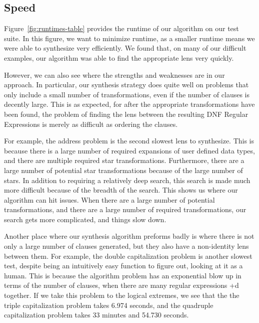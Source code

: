 \documentclass[numbers]{sigplanconf}
\begin{document}
\subsection{Speed}
Figure~\ref{fig:runtimes-table} provides the runtime of our algorithm on our
test suite.
In this figure, we want to minimize runtime, as a smaller runtime means we were
able to synthesize very efficiently.
We found that, on many of our difficult examples, our algorithm was able to find
the appropriate lens very quickly.

However, we can also see where the strengths and weaknesses are in our approach.
In particular, our synthesis strategy does quite well on problems that only
include a small number of transformations, even if the number of clauses is
decently large.
This is as expected, for after the appropriate transformations have been found,
the problem of finding the lens between the resulting DNF Regular Expressions
is merely as difficult as ordering the clauses.

For example, the address problem is the second slowest lens to synthesize.
This is because there is a large number of required expansions of user defined
data types, and there are multiple required star transformations.
Furthermore, there are a large number of potential star transformations because
of the large number of stars.
In addition to requiring a relatively deep search, this search is made much
more difficult because of the breadth of the search.
This shows us where our algorithm can hit issues.
When there are a large number of potential transformations, and there are a
large number of required transformations, our search gets more complicated,
and things slow down.

Another place where our synthesis algorithm preforms badly is where there is not
only a large number of clauses generated, but they also have a non-identity
lens between them.
For example, the double capitalization problem is another slowest test, despite
being an intuitively easy function to figure out, looking at it as a human.
This is because the algorithm problem has an exponential blow up in terms
of the number of clauses, when there are many regular expressions +d together.
If we take this problem to the logical extremes, we see that the the triple
capitalization problem takes 6.974 seconds, and the quadruple capitalization
problem takes 33 minutes and 54.730 seconds.
\end{document}
